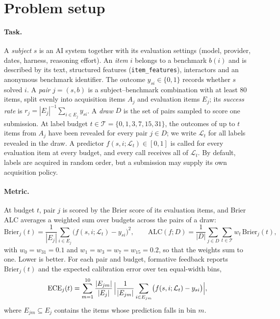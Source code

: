 \documentclass{article}
\newcommand{\Brier}{\mathrm{Brier}}
\newcommand{\ECE}{\mathrm{ECE}}
\newcommand{\ALC}{\mathrm{ALC}}
\begin{document}
\section{Problem setup}
\label{sec:setup}

\paragraph{Task.} A \emph{subject} $s$ is an AI system together with its evaluation settings (model, provider, dates, harness, reasoning effort). An \emph{item} $i$ belongs to a benchmark $b(i)$ and is described by its text, structured features (\texttt{item\_features}), interactors and an anonymous benchmark identifier. The outcome $y_{si} \in \{0,1\}$ records whether $s$ solved $i$. A \emph{pair} $j=(s,b)$ is a subject--benchmark combination with at least 80 items, split evenly into acquisition items $A_j$ and evaluation items $E_j$; its \emph{success rate} is $r_j = |E_j|^{-1} \sum_{i \in E_j} y_{si}$. A \emph{draw} $D$ is the set of pairs sampled to score one submission. At label budget $t \in \mathcal{T} = \{0, 1, 3, 7, 15, 31\}$, the outcomes of up to $t$ items from $A_j$ have been revealed for every pair $j \in D$; we write $\mathcal{L}_t$ for all labels revealed in the draw. A predictor $f(s, i; \mathcal{L}_t) \in [0,1]$ is called for every evaluation item at every budget, and every call receives all of $\mathcal{L}_t$. By default, labels are acquired in random order, but a submission may supply its own acquisition policy.

\paragraph{Metric.} At budget $t$, pair $j$ is scored by the Brier score of its evaluation items, and Brier ALC averages a weighted sum over budgets across the pairs of a draw:
\begin{equation}
  \Brier_j(t) = \frac{1}{|E_j|} \sum_{i \in E_j} \bigl(f(s, i; \mathcal{L}_t) - y_{si}\bigr)^2, \qquad
  \ALC(f; D) = \frac{1}{|D|} \sum_{j \in D} \sum_{t \in \mathcal{T}} w_t \, \Brier_j(t),
  \label{eq:alc}
\end{equation}
with $w_0 = w_{31} = 0.1$ and $w_1 = w_3 = w_7 = w_{15} = 0.2$, so that the weights sum to one. Lower is better. For each pair and budget, formative feedback reports $\Brier_j(t)$ and the expected calibration error over ten equal-width bins,
\begin{equation}
  \ECE_j(t) = \sum_{m=1}^{10} \frac{|E_{jm}|}{|E_j|} \, \Bigl| \frac{1}{|E_{jm}|} \sum_{i \in E_{jm}} \bigl(f(s, i; \mathcal{L}_t) - y_{si}\bigr) \Bigr|,
  \label{eq:ece}
\end{equation}
where $E_{jm} \subseteq E_j$ contains the items whose prediction falls in bin $m$.
\end{document}
